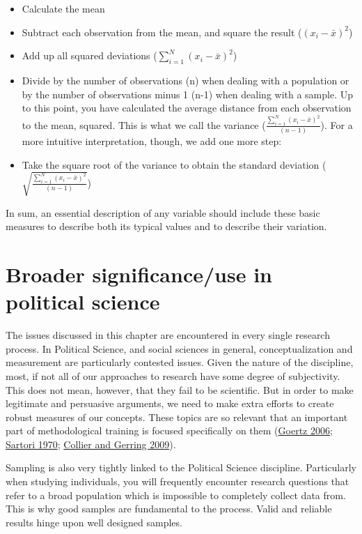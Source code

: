 \documentclass{book}
\begin{document}
\begin{itemize}
\item
  Calculate the mean
\item
  Subtract each observation from the mean, and square the result
  (\((x_i -\bar{x})^2\))
\item
  Add up all squared deviations (\(\sum_{i=1}^{N}(x_i -\bar{x})^2\))
\item
  Divide by the number of observations (n) when dealing with a population or
  by the number of observations minus 1 (n-1) when dealing with a sample. Up
  to this point, you have calculated the average distance from each
  observation to the mean, squared. This is what we call the variance
  (\(\frac{\sum_{i=1}^{N}(x_i -\bar{x})^2}{(n-1)}\)). For a more intuitive
  interpretation, though, we add one more step:
\item
  Take the square root of the variance to obtain the standard deviation
  (\(\sqrt{\frac{\sum_{i=1}^{N}(x_i -\bar{x})^2}{(n-1)}}\))
\end{itemize}

In sum, an essential description of any variable should include these basic
measures to describe both its typical values and to describe their variation.

\hypertarget{broader-significanceuse-in-political-science}{%
\section{Broader significance/use in political
science}\label{broader-significanceuse-in-political-science}}

The issues discussed in this chapter are encountered in every single research
process. In Political Science, and social sciences in general,
conceptualization and measurement are particularly contested issues. Given the
nature of the discipline, most, if not all of our approaches to research have
some degree of subjectivity. This does not mean, however, that they fail to be
scientific. But in order to make legitimate and persuasive arguments, we need
to make extra efforts to create robust measures of our concepts. These topics
are so relevant that an important part of methodological training is focused
specifically on them (\protect\hyperlink{ref-goertz2006}{Goertz 2006};
\protect\hyperlink{ref-sartori1970}{Sartori 1970};
\protect\hyperlink{ref-collier2009}{Collier and Gerring 2009}).

Sampling is also very tightly linked to the Political Science discipline.
Particularly when studying individuals, you will frequently encounter research
questions that refer to a broad population which is impossible to completely
collect data from. This is why good samples are fundamental to the process.
Valid and reliable results hinge upon well designed samples.
\end{document}
